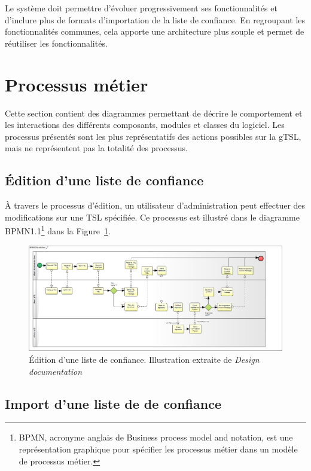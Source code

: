 \documentclass{tnreport}
\begin{document}
Le système doit permettre d'évoluer progressivement ses fonctionnalités et d'inclure plus de formats d'importation de la liste de confiance. En regroupant les fonctionnalités communes, cela apporte une architecture plus souple et permet de réutiliser les fonctionnalités.
\fi

\section{Processus métier}

Cette section contient des diagrammes permettant de décrire le comportement et les interactions des différents composants, modules et classes du logiciel. Les processus présentés sont les plus représentatifs des actions possibles sur la gTSL, mais ne représentent pas la totalité des processus.

\subsection{Édition d'une liste de confiance}

À travers le processus d'édition, un utilisateur d'administration peut effectuer des modifications sur une TSL spécifiée.
Ce processus est illustré dans le diagramme BPMN1.1\footnote{BPMN, acronyme anglais de Business process model and notation, est une représentation graphique pour spécifier les processus métier dans un modèle de processus métier.} dans la Figure~\ref{fig:edit-flow}.

\begin{figure}[h]
	\centering
	\includegraphics[scale=0.3]{figures/edit-flow}
	\caption{Édition d'une liste de confiance. Illustration extraite de \textit{Design documentation}~\cite{design-document}}
	\label{fig:edit-flow}
\end{figure}

\subsection{Import d'une liste de de confiance}
\end{document}
